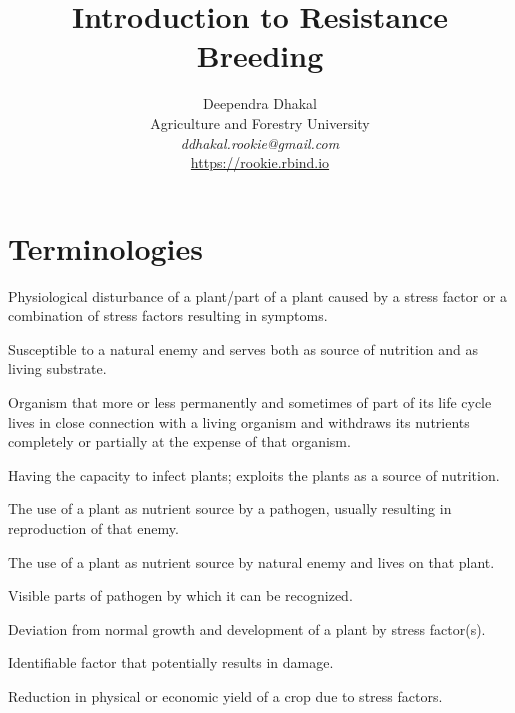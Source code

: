 \documentclass[11pt,dvipsnames,ignorenonframetext,aspectratio=169]{beamer}
\title[]{Introduction to Resistance Breeding}
\author[
        \vspace{-0.5cm}Deependra Dhakal\\
Agriculture and Forestry University\\
\textit{ddhakal.rookie@gmail.com}\\
\url{https://rookie.rbind.io}
    ]{\vspace{-0.5cm}Deependra Dhakal\\
Agriculture and Forestry University\\
\textit{ddhakal.rookie@gmail.com}\\
\url{https://rookie.rbind.io}}
\date[
      
  ]{
    }
\begin{document}
  \begin{frame}[plain]
  \titlepage
  \end{frame}



\hypertarget{terminologies}{%
\section{Terminologies}\label{terminologies}}

\begin{frame}{}
\protect\hypertarget{section}{}
\begin{description}
\small
\item[Disease] Physiological disturbance of a plant/part of a plant caused by a stress factor or a combination of stress factors resulting in symptoms.
\item[Host] Susceptible to a natural enemy and serves both as source of nutrition and as living substrate.
\item[Parasite] Organism that more or less permanently and sometimes of part of its life cycle lives in close connection with a living organism and withdraws its nutrients completely or partially at the expense of that organism.
\item[Pathogen] Having the capacity to infect plants; exploits the plants as a source of nutrition.
\end{description}
\end{frame}

\begin{frame}{}
\protect\hypertarget{section-1}{}
\begin{description}
\small
\item[Infection] The use of a plant as nutrient source by a pathogen, usually resulting in reproduction of that enemy.
\item[Infestation] The use of a plant as nutrient source by natural enemy and lives on that plant.
\item[Sign] Visible parts of pathogen by which it can be recognized.
\item[Symptom] Deviation from normal growth and development of a plant by stress factor(s).
\item[Stress factor] Identifiable factor that potentially results in damage.
\item[Damage] Reduction in physical or economic yield of a crop due to stress factors.
\end{description}
\end{frame}
\end{document}
